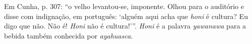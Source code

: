 Em Cunha, p. 307: \enquote{o velho levantou-se, imponente. Olhou para o auditório e disse com indignação, em português: \enquote{alguém aqui acha que \textit{honi} é cultura? Eu digo que não. Não é! \textit{Honi} não é cultura!}}. \textit{Honi} é a palavra \textit{yawanawa} para a bebida também conhecida por \textit{ayahuasca}.